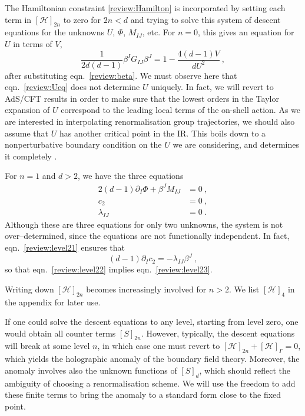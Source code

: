 \documentclass[a4paper,12pt]{article}
\begin{document}
The Hamiltonian constraint \eqref{review:Hamilton} is incorporated by
setting each term in $[\mathcal{H}]_{2n}$ to zero for $2n<d$ and
trying to solve this system of descent equations for the unknowns 
$U$, $\Phi$, $M_{IJ}$, etc. For $n=0$, this gives an equation for $U$
in terms of $V$, 
\begin{equation}
\label{review:Ueq}
  \frac1{2d(d-1)} \beta^I G_{IJ} \beta^J = 1 - \frac{4(d-1)V}{dU^2}~,
\end{equation}
after substituting eqn.\ \eqref{review:beta}. We must observe here
that eqn.\ \eqref{review:Ueq} does not determine $U$ uniquely. In
fact, we will revert to AdS/CFT results in order to make sure that the lowest
orders in the Taylor expansion of $U$ correspond to the leading local terms of
the on-shell action. 
As we are interested in interpolating renormalisation group trajectories, we
should also assume that $U$ has another critical point in the IR. This 
boils down to a nonperturbative boundary condition on the $U$ we are 
considering, and determines it completely \cite{Campos00}.



For $n=1$ and $d>2$, we have the three equations
\begin{align}
\label{review:level21}
  2(d-1) \partial_I \Phi + \beta^J M_{IJ} &= 0~,\\
\label{review:level22}
  c_2 &=0~,\\
\label{review:level23}
  \lambda_{IJ} &=0~. 
\end{align}
Although these are three equations for only two unknowns, the system
is not over--determined, since the equations are not functionally
independent. In fact, eqn.\ \eqref{review:level21} ensures that 
\begin{equation}
\label{review:c2lambda}
  (d-1) \partial_I c_2 = -\lambda_{IJ} \beta^J~,
\end{equation}
so that eqn.\ \eqref{review:level22} implies eqn.\ \eqref{review:level23}.

Writing down $[\mathcal{H}]_{2n}$ becomes increasingly involved for
$n>2$. We list $[\mathcal{H}]_4$ in the appendix for later use.  

If one could solve the descent equations to any level, starting from
level zero, one would obtain all counter terms $[S]_{2n}$. However,
typically, the descent equations will break at some
level $n$, in which case one must revert to $[\mathcal{H}]_{2n}
+[\mathcal{H}]_\Gamma =0$, which yields the holographic anomaly of the
boundary field theory. Moreover, the anomaly involves also the unknown
functions of $[S]_d$, which should reflect the ambiguity of choosing a
renormalisation scheme. 
We will use the freedom to add these finite terms to bring the anomaly
to a standard form close to the fixed point. 
\end{document}
